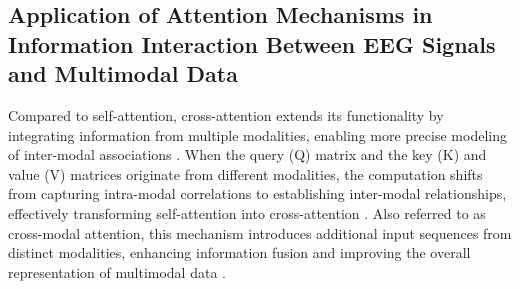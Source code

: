\documentclass[preprint,12pt]{elsarticle}
\begin{document}
\subsection{Application of Attention Mechanisms in Information Interaction Between EEG Signals and Multimodal Data}

Compared to self-attention, cross-attention extends its functionality by integrating information from multiple modalities, enabling more precise modeling of inter-modal associations \cite{li2024multimodal}. When the query (Q) matrix and the key (K) and value (V) matrices originate from different modalities, the computation shifts from capturing intra-modal correlations to establishing inter-modal relationships, effectively transforming self-attention into cross-attention \cite{lee2022cross}. Also referred to as cross-modal attention, this mechanism introduces additional input sequences from distinct modalities, enhancing information fusion and improving the overall representation of multimodal data \cite{wang2022scanet}\cite{zhao2024deep}.
\end{document}
